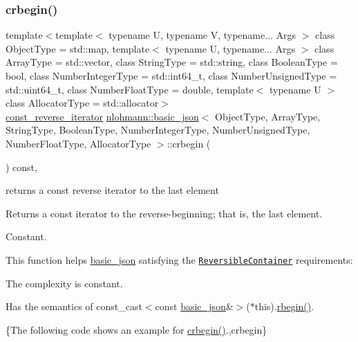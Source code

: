 \subsubsection{\texorpdfstring{crbegin()}{crbegin()}}
{\footnotesize\ttfamily template$<$template$<$ typename U, typename V, typename... Args $>$ class Object\+Type = std\+::map, template$<$ typename U, typename... Args $>$ class Array\+Type = std\+::vector, class String\+Type  = std\+::string, class Boolean\+Type  = bool, class Number\+Integer\+Type  = std\+::int64\+\_\+t, class Number\+Unsigned\+Type  = std\+::uint64\+\_\+t, class Number\+Float\+Type  = double, template$<$ typename U $>$ class Allocator\+Type = std\+::allocator$>$ \\
\hyperlink{classnlohmann_1_1basic__json_ae336fff01f4b78e3e16e5008dc8dbc00}{const\+\_\+reverse\+\_\+iterator} \hyperlink{classnlohmann_1_1basic__json}{nlohmann\+::basic\+\_\+json}$<$ Object\+Type, Array\+Type, String\+Type, Boolean\+Type, Number\+Integer\+Type, Number\+Unsigned\+Type, Number\+Float\+Type, Allocator\+Type $>$\+::crbegin (\begin{DoxyParamCaption}{ }\end{DoxyParamCaption}) const\hspace{0.3cm}{\ttfamily [inline]}, {\ttfamily [noexcept]}}



returns a const reverse iterator to the last element 

Returns a const iterator to the reverse-\/beginning; that is, the last element.

  Constant.

This function helps {\ttfamily \hyperlink{classnlohmann_1_1basic__json}{basic\+\_\+json}} satisfying the \href{http://en.cppreference.com/w/cpp/concept/ReversibleContainer}{\tt Reversible\+Container} requirements\+:
\begin{DoxyItemize}
\item The complexity is constant.
\item Has the semantics of {\ttfamily const\+\_\+cast$<$const \hyperlink{classnlohmann_1_1basic__json}{basic\+\_\+json}\&$>$($\ast$this).\hyperlink{classnlohmann_1_1basic__json_a62ccf5b9b3674aec2403fbc02da03db8}{rbegin()}}.
\end{DoxyItemize}

\{The following code shows an example for {\ttfamily \hyperlink{classnlohmann_1_1basic__json_a060b33f8f255986088652625f9d50681}{crbegin()}}.,crbegin\}

